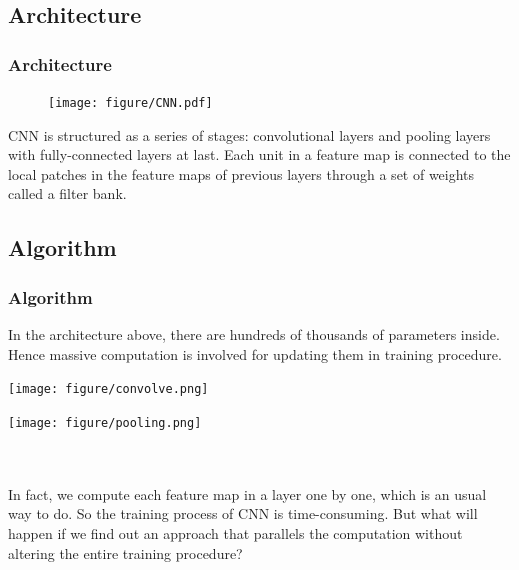 \documentclass[10pt, mathserif]{beamer}	%
\newcommand{\ftitle}[1]{\frametitle{\hspace{4ex} {#1}}}	%
\begin{document}
\begin{CJK}{UTF8}{song}
\subsection{Architecture}
\begin{frame}
	\ftitle{Architecture}
	\begin{figure}[htbp]
		\centering
		\texttt{[image: figure/CNN.pdf]}
	\end{figure}
	CNN is structured as a series of stages: convolutional layers and pooling layers with fully-connected layers at last. Each unit in a feature map is connected to the local patches in the feature maps of previous layers through a set of weights called a filter bank.
\end{frame}

\subsection{Algorithm}
\begin{frame}
	\ftitle{Algorithm}
		In the architecture above, there are hundreds of thousands of parameters inside. Hence massive computation is involved for updating them in training procedure.\\
	\begin{minipage}{0.45\textwidth}
		\centering
		\texttt{[image: figure/convolve.png]}
	\end{minipage}
	\begin{minipage}{0.45\textwidth}
		\centering
		\texttt{[image: figure/pooling.png]}
	\end{minipage}\\
	~\\
	In fact, we compute each feature map in a layer one by one, which is an usual way to do. So the training process of CNN is time-consuming. But what will happen if we find out an approach that parallels the computation without altering the entire training procedure?
\end{frame}


\end{CJK}
\end{document}

